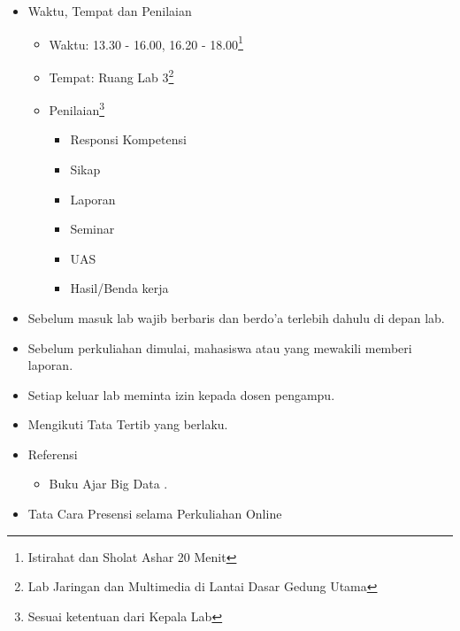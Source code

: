 \documentclass[a4paper]{tufte-handout}
\begin{document}
\begin{maybe}
\begin{itemize}
\item Waktu, Tempat dan Penilaian


\begin{itemize}
\item Waktu: 13.30 - 16.00, 16.20 - 18.00\footnote{Istirahat dan Sholat Ashar 20 Menit}
\item Tempat: Ruang Lab 3\footnote{Lab Jaringan dan Multimedia di Lantai Dasar Gedung Utama}
\item Penilaian\footnote{Sesuai ketentuan dari Kepala Lab}

\begin{multicols}{2}
\begin{itemize}
\item Responsi Kompetensi
\item Sikap
\item Laporan
\item Seminar
\item UAS
\item Hasil/Benda kerja
\end{itemize}
\end{multicols}
\end{itemize}

\item Sebelum masuk lab wajib berbaris dan berdo'a terlebih dahulu di depan lab.
\item Sebelum perkuliahan dimulai, mahasiswa atau yang mewakili memberi laporan.
\item Setiap keluar lab meminta izin kepada dosen pengampu.
\item Mengikuti Tata Tertib yang berlaku.
\item Referensi

\begin{itemize}
\item Buku Ajar Big Data \citep{Mursyidah2020}.
\end{itemize}

\item Tata Cara Presensi selama Perkuliahan Online


\end{itemize}
\end{maybe}
\end{document}
